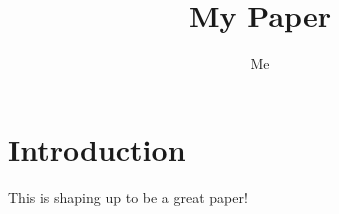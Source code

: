 \documentclass{article}
\title{My Paper}
\author{Me}
\begin{document}
\maketitle

\section{Introduction}

This is shaping up to be a great paper!
\end{document}

